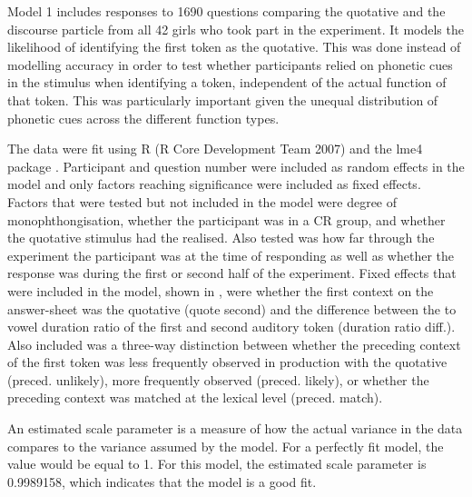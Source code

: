 Model 1 includes responses to 1690 questions comparing the quotative and the discourse particle from all 42 girls who took part in the experiment. It models the likelihood of identifying the first token as the quotative. This was done instead of modelling accuracy in order to test whether participants relied on phonetic cues in the stimulus when identifying a token, independent of the actual function of that token. This was particularly important given the unequal distribution of phonetic cues across the different function types.

The data were fit using R (R Core Development Team 2007) and the lme4 package \citep{lme4}.  Participant and question num\-ber were in\-cluded as ran\-dom effects in the mo\-del and only factors reaching significance were included as fixed effects. Fac\-tors that were test\-ed but not in\-cluded in the mo\-del were de\-gree of mo\-noph\-thong\-isa\-tion, whether the participant was in a CR group, and whether the quotative stimulus had the  realised. Also tested was how far through the experiment the participant was at the time of responding as well as whether the response was during the first or second half of the experiment. Fixed effects that were included in the model, shown in , were whether the first context on the answer-sheet was the quotative (quote second) and the difference between the  to vowel duration ratio of the first and second auditory token (duration ratio diff.). Also included was a three-way distinction between whether the preceding context of the first token was less frequently observed in production with the quotative (preced. unlikely), more frequently observed (preced. likely), or whether the preceding context was matched at the lexical level (preced. match). 

An estimated scale parameter is a measure of how the actual variance in the data compares to the variance assumed by the model. For a perfectly fit model, the value would be equal to 1. For this model, the estimated scale parameter is 0.9989158, which indicates that the model is a good fit. 


